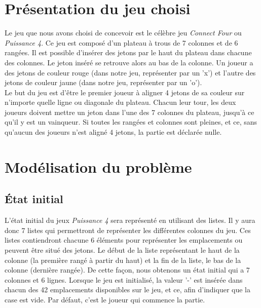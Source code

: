 \documentclass[12pt]{article}
\begin{document}
\section*{Présentation du jeu choisi}
Le jeu que nous avons choisi de concevoir est le célèbre jeu \textit{Connect Four} ou \textit{Puissance 4}. Ce jeu est composé d'un plateau à trous de 7 colonnes et de 6 rangées. Il est possible d'insérer des jetons par le haut du plateau dans chacune des colonnes. Le jeton inséré se retrouve alors au bas de la colonne. Un joueur a des jetons de couleur rouge (dans notre jeu, représenter par un 'x') et l'autre des jetons de couleur jaune (dans notre jeu, représenter par un 'o').\\

Le but du jeu est d'être le premier joueur à aligner 4 jetons de sa couleur sur n'importe quelle ligne ou diagonale du plateau. Chacun leur tour, les deux joueurs doivent mettre un jeton dans l'une des 7 colonnes du plateau, jusqu'à ce qu'il y est un vainqueur. Si toutes les rangées et colonnes sont pleines, et ce, sans qu'aucun des joueurs n'est aligné 4 jetons, la partie est déclarée nulle.

\section*{Modélisation du problème}

\subsection*{État initial}
L'état initial du jeux \textit{Puissance 4} sera représenté en utilisant des listes. Il y aura donc 7 listes qui permettront de représenter les différentes colonnes du jeu. Ces listes contiendront chacune 6 éléments pour représenter les emplacements ou peuvent être situé des jetons. Le début de la liste représentant le haut de la colonne (la première rangé à partir du haut) et la fin de la liste, le bas de la colonne (dernière rangée). De cette façon, nous obtenons un état initial qui a 7 colonnes et 6 lignes. Lorsque le jeu est initialisé, la valeur '-' est insérée dans chacun des 42 emplacements disponibles sur le jeu, et ce, afin d'indiquer que la case est vide. Par défaut, c'est le joueur qui commence la partie.
\end{document}
